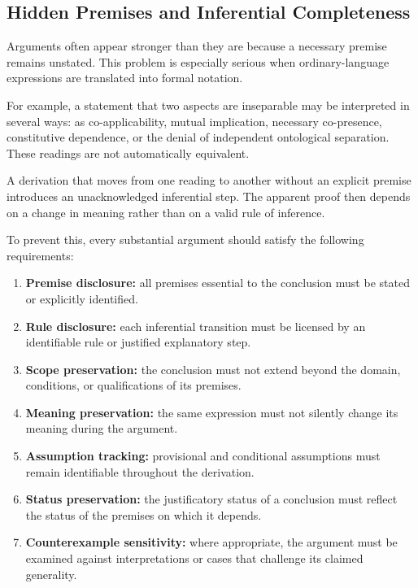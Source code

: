 \subsection{Hidden Premises and Inferential Completeness}

Arguments often appear stronger than they are because a necessary
premise remains unstated. This problem is especially serious when
ordinary-language expressions are translated into formal notation.

For example, a statement that two aspects are inseparable may be
interpreted in several ways: as co-applicability, mutual
implication, necessary co-presence, constitutive dependence, or
the denial of independent ontological separation. These readings
are not automatically equivalent.

A derivation that moves from one reading to another without an
explicit premise introduces an unacknowledged inferential step.
The apparent proof then depends on a change in meaning rather than
on a valid rule of inference.

To prevent this, every substantial argument should satisfy the
following requirements:

\begin{enumerate}
    \item \textbf{Premise disclosure:} all premises essential to the
    conclusion must be stated or explicitly identified.

    \item \textbf{Rule disclosure:} each inferential transition
    must be licensed by an identifiable rule or justified
    explanatory step.

    \item \textbf{Scope preservation:} the conclusion must not
    extend beyond the domain, conditions, or qualifications of
    its premises.

    \item \textbf{Meaning preservation:} the same expression must
    not silently change its meaning during the argument.

    \item \textbf{Assumption tracking:} provisional and conditional
    assumptions must remain identifiable throughout the derivation.

    \item \textbf{Status preservation:} the justificatory status
    of a conclusion must reflect the status of the premises on
    which it depends.

    \item \textbf{Counterexample sensitivity:} where appropriate,
    the argument must be examined against interpretations or
    cases that challenge its claimed generality.
\end{enumerate}

